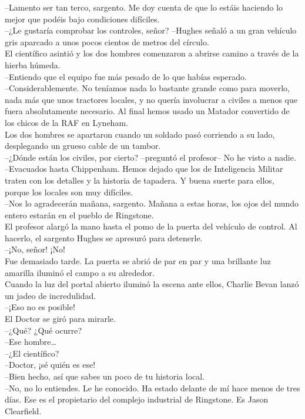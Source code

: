 --Lamento ser tan terco, sargento. Me doy cuenta de que lo estáis
haciendo lo mejor que podéis bajo condiciones difíciles.\\
--¿Le gustaría comprobar los controles, señor? --Hughes señaló a un gran
vehículo gris aparcado a unos pocos cientos de metros del círculo.\\
El científico asintió y los dos hombres comenzaron a abrirse camino a
través de la hierba húmeda.\\
--Entiendo que el equipo fue más pesado de lo que habías esperado.\\
--Considerablemente. No teníamos nada lo bastante grande como para
moverlo, nada más que unos tractores locales, y no quería involucrar a
civiles a menos que fuera absolutamente necesario. Al final hemos usado
un Matador convertido de los chicos de la RAF en Lyneham.\\
Los dos hombres se apartaron cuando un soldado pasó corriendo a su lado,
desplegando un grueso cable de un tambor.\\
--¿Dónde están los civiles, por cierto? --preguntó el profesor-- No he
visto a nadie.\\
--Evacuados hasta Chippenham. Hemos dejado que los de Inteligencia
Militar traten con los detalles y la historia de tapadera. Y buena
suerte para ellos, porque los locales son muy difíciles.\\
--Nos lo agradecerán mañana, sargento. Mañana a estas horas, los ojos
del mundo entero estarán en el pueblo de Ringstone.\\
El profesor alargó la mano hasta el pomo de la puerta del vehículo de
control. Al hacerlo, el sargento Hughes se apresuró para detenerle.\\
--¡No, señor! ¡No!\\
Fue demasiado tarde. La puerta se abrió de par en par y una brillante
luz amarilla iluminó el campo a su alrededor.\\[2\baselineskip]Cuando la
luz del portal abierto iluminó la escena ante ellos, Charlie Bevan lanzó
un jadeo de incredulidad.\\
--¡Eso no es posible!\\
El Doctor se giró para mirarle.\\
--¿Qué? ¿Qué ocurre?\\
--Ese hombre\ldots{}\\
--¿El científico?\\
--Doctor, ¡sé quién es ese!\\
--Bien hecho, así que sabes un poco de tu historia local.\\
--No, no lo entiendes. Le he conocido. Ha estado delante de mí hace
menos de tres días. Ese es el propietario del complejo industrial de
Ringstone. Es Jason Clearfield.\\[2\baselineskip]
